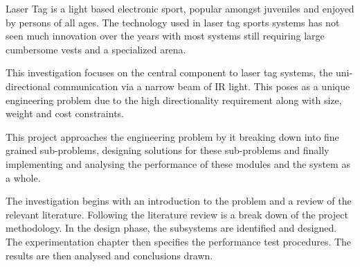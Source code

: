 Laser Tag is a light based electronic sport, popular amongst juveniles and enjoyed by persons of all ages. The technology used in laser tag sports systems has not seen much innovation over the years with most systems still requiring large cumbersome vests and a specialized arena.

This investigation focuses on the central component to laser tag systems, the uni-directional communication via a narrow beam of IR light. This poses as a unique engineering problem due to the high directionality requirement along with size, weight and cost constraints.

This project approaches the engineering problem by it breaking down into fine grained sub-problems, designing solutions for these sub-problems and finally implementing and analysing the performance of these modules and the system as a whole.

The investigation begins with an introduction to the problem and a review of the relevant literature. Following the literature review is a break down of the project methodology. In the design phase, the subsystems are identified and designed. The experimentation chapter then specifies the performance test procedures. The results are then analysed and conclusions drawn.